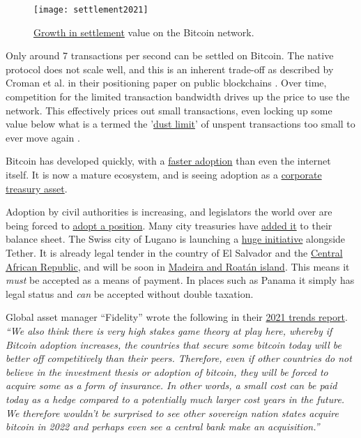 \begin{figure}
  \centering
    \texttt{[image: settlement2021]}
  \caption{\href{https://twitter.com/glxyresearch/status/1469039427028664320?}{Growth in settlement} value on the Bitcoin network.}
  \label{fig:settled2021}
\end{figure}
Only around 7 transactions per second can be settled on Bitcoin. The native protocol does not scale well, and this is an inherent trade-off as described by Croman et al. in their positioning paper on public blockchains \cite{croman2016scaling}. Over time, competition for the limited transaction bandwidth drives up the price to use the network. This effectively prices out small transactions, even locking up some value below what is a termed the '\href{https://github.com/bitcoin/bitcoin/blob/v0.10.0rc3/src/primitives/transaction.h#L137}{dust limit}' of unspent transactions too small to ever move again \cite{delgado2018analysis}. \par
Bitcoin has developed quickly, with a \href{https://phemex.com/blogs/crypto-bitcoin-s-curve-adoption-curve}{faster adoption} than even the internet itself. It is now a mature ecosystem, and is seeing adoption as a \href{https://bitcointreasuries.net/}{corporate treasury asset}. \par
Adoption by civil authorities is increasing, and legislators the world over are being forced to \href{https://www.politico.com/news/2022/01/16/bitcoin-crashes-the-midterms-527126}{adopt a position}. Many city treasuries have \href{https://www.bloomberg.com/news/articles/2022-01-14/rio-de-janeiro-wants-to-become-brazil-s-cryptocurrency-capital}{added it} to their balance sheet. The Swiss city of Lugano is launching a \href{https://twitter.com/Stadicus3000/status/1499656424422526977}{huge initiative} alongside Tether. It is already legal tender in the country of El Salvador\cite{oxford2021salvador} and the \href{https://finance.yahoo.com/news/central-african-republic-passes-bill-180910797.html?}{Central African Republic}, and will be soon in \href{https://www.forbes.com/sites/ninabambysheva/2022/04/07/two-new-territories-are-adopting-bitcoin/?sh=7f014ed2499a}{Madeira and Roatán island}. This means it \textit{must} be accepted as a means of payment. In places such as Panama it simply has legal status and \textit{can} be accepted without double taxation.\par 
Global asset manager ``Fidelity'' wrote the following in their \href{https://www.fidelitydigitalassets.com/articles/2021-trends-impact}{2021 trends report}. \textit{``We also think there is very high stakes game theory at play here, whereby if Bitcoin adoption increases, the countries that secure some bitcoin today will be better off competitively than their peers. Therefore, even if other countries do not believe in the investment thesis or adoption of bitcoin, they will be forced to acquire some as a form of insurance. In other words, a small cost can be paid today as a hedge compared to a potentially much larger cost years in the future. We therefore wouldn't be surprised to see other sovereign nation states acquire bitcoin in 2022 and perhaps even see a central bank make an acquisition.''}\par
